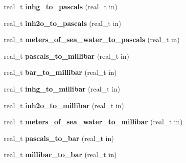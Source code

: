 \begin{DoxyCompactItemize}
\item 
\hypertarget{namespaceetk_a9a648baae265cb37b570d11ad6cc768c}{real\-\_\-t {\bfseries inhg\-\_\-to\-\_\-pascals} (real\-\_\-t in)}\label{namespaceetk_a9a648baae265cb37b570d11ad6cc768c}

\item 
\hypertarget{namespaceetk_ac76427f06ac4002553e8800a112e9649}{real\-\_\-t {\bfseries inh2o\-\_\-to\-\_\-pascals} (real\-\_\-t in)}\label{namespaceetk_ac76427f06ac4002553e8800a112e9649}

\item 
\hypertarget{namespaceetk_a31f7e73822764b34257b64a3e74661d8}{real\-\_\-t {\bfseries meters\-\_\-of\-\_\-sea\-\_\-water\-\_\-to\-\_\-pascals} (real\-\_\-t in)}\label{namespaceetk_a31f7e73822764b34257b64a3e74661d8}

\item 
\hypertarget{namespaceetk_af03f898d241479c3a5588829b70dec4e}{real\-\_\-t {\bfseries pascals\-\_\-to\-\_\-millibar} (real\-\_\-t in)}\label{namespaceetk_af03f898d241479c3a5588829b70dec4e}

\item 
\hypertarget{namespaceetk_a291170ce781d4ba42cebde03d6a2fcbe}{real\-\_\-t {\bfseries bar\-\_\-to\-\_\-millibar} (real\-\_\-t in)}\label{namespaceetk_a291170ce781d4ba42cebde03d6a2fcbe}

\item 
\hypertarget{namespaceetk_a5fce250bdb7471c47d1070fb6eb89dc7}{real\-\_\-t {\bfseries inhg\-\_\-to\-\_\-millibar} (real\-\_\-t in)}\label{namespaceetk_a5fce250bdb7471c47d1070fb6eb89dc7}

\item 
\hypertarget{namespaceetk_a4b493c3cdc8afba0d52c44539c915450}{real\-\_\-t {\bfseries inh2o\-\_\-to\-\_\-millibar} (real\-\_\-t in)}\label{namespaceetk_a4b493c3cdc8afba0d52c44539c915450}

\item 
\hypertarget{namespaceetk_a08788376aa204faccc622518dbb5bca9}{real\-\_\-t {\bfseries meters\-\_\-of\-\_\-sea\-\_\-water\-\_\-to\-\_\-millibar} (real\-\_\-t in)}\label{namespaceetk_a08788376aa204faccc622518dbb5bca9}

\item 
\hypertarget{namespaceetk_a624e50082bc6dcaf7d6ff99b5149a3af}{real\-\_\-t {\bfseries pascals\-\_\-to\-\_\-bar} (real\-\_\-t in)}\label{namespaceetk_a624e50082bc6dcaf7d6ff99b5149a3af}

\item 
\hypertarget{namespaceetk_a5d77cad2b1dd3278d68a5182acc056bd}{real\-\_\-t {\bfseries millibar\-\_\-to\-\_\-bar} (real\-\_\-t in)}\label{namespaceetk_a5d77cad2b1dd3278d68a5182acc056bd}


\end{DoxyCompactItemize}
